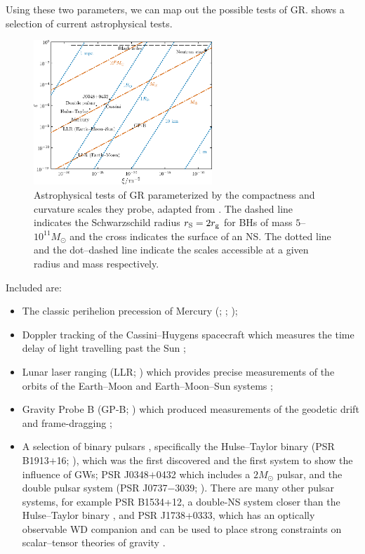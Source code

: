 Using these two parameters, we can map out the possible tests of GR.  shows a selection of current astrophysical tests.
\begin{figure}
  \centering
  \includegraphics[width=0.6\textwidth]{./images/Fig_Psaltis_plot}
    \caption{Astrophysical tests of GR parameterized by the compactness and curvature scales they probe, adapted from \citet{Psaltis2008a}. The dashed line indicates the Schwarzschild radius $r_\mathrm{S} = 2 r_\mathrm{g}$ for BHs of mass $5$--$10^{11} M_\odot$ and the cross indicates the surface of an NS. The dotted line and the dot--dashed line indicate the scales accessible at a given radius and mass respectively.}  
    \label{fig:Psaltis} 
\end{figure}
Included are:
\begin{itemize}
\item The classic perihelion precession of Mercury (\citealt[section 10.2]{Hobson2006}; \citealt[section 7.3]{Will1993}; \citealt{Pitjeva2013});
\item Doppler tracking of the Cassini--Huygens spacecraft \citep{Bertotti2003} which measures the time delay of light travelling past the Sun \citep[section 7.2]{Will1993};
\item Lunar laser ranging (LLR; \citealt{Bender1973,Williams2012}) which provides precise measurements of the orbits of the Earth--Moon and Earth--Moon--Sun systems \citep[section 8.1]{Will1993};
\item Gravity Probe B (GP-B; \citealt{Everitt2009,Everitt2011}) which produced measurements of the geodetic drift and frame-dragging \citep[section 9.1]{Will1993};
\item A selection of binary pulsars \citep{Taylor1993,Stairs2003}, specifically the Hulse--Taylor binary (PSR B1913$+$16; \citealt{Hulse1975,Weisberg2010}), which was the first discovered and the first system to show the influence of GWs; PSR J0348$+$0432 \citep{Antoniadis2013} which includes a $2 M_\odot$ pulsar, and the double pulsar system (PSR J0737$-$3039; \citealt{Breton2008,Kramer2008}). There are many other pulsar systems, for example PSR B1534+12, a double-NS system closer than the Hulse--Taylor binary \citep{Stairs2002}, and PSR J1738+0333, which has an optically observable WD companion \citep{Antoniadis2012} and can be used to place strong constraints on scalar--tensor theories of gravity \citep{Freire2012}.
\end{itemize}
